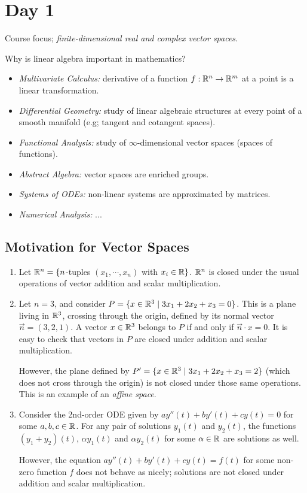 
\section{Day 1}

Course focus; \emph{finite-dimensional real and complex vector spaces}.

Why is linear algebra important in mathematics?
\begin{itemize}
\item \emph{Multivariate Calculus:} derivative of a function $f:\mathbb{R}^n\to\mathbb{R}^m$ at a point is a linear transformation.
\item \emph{Differential Geometry:} study of linear algebraic structures at every point of a smooth manifold (e.g; tangent and cotangent spaces).
\item \emph{Functional Analysis:} study of $\infty$-dimensional vector spaces (spaces of functions).
\item \emph{Abstract Algebra:} vector spaces are enriched groups.
\item \emph{Systems of ODEs:} non-linear systems are approximated by matrices.
\item \emph{Numerical Analysis:} ...
\end{itemize}

\separator

\subsection{Motivation for Vector Spaces}
\begin{enumerate}[Ex. A)]
\item Let $\mathbb{R}^n=\{n$-tuples $(x_1, \cdots, x_n)$ with $x_i\in\mathbb{R}\}$. $\mathbb{R}^n$ is closed under the usual operations of vector addition and scalar multiplication.

\item Let $n=3$, and consider $P=\{x\in\mathbb{R}^3 \mid 3x_1+2x_2+x_3=0\}$. This is a plane living in $\mathbb{R}^3$, crossing through the origin, defined by its normal vector $\vec{n}=(3,2,1)$. A vector $x\in\mathbb{R}^3$ belongs to $P$ if and only if $\vec{n}\cdot x = 0$. It is easy to check that vectors in $P$ are closed under addition and scalar multiplication.

	However, the plane defined by $P'=\{x\in\mathbb{R}^3 \mid 3x_1+2x_2+x_3=2\}$ (which does not cross through the origin) is not closed under those same operations. This is an example of an \emph{affine space}.

\item Consider the 2nd-order ODE given by $ay''(t)+by'(t)+cy(t)=0$ for some $a,b,c\in\mathbb{R}$. For any pair of solutions $y_1(t)$ and $y_2(t)$, the functions $(y_1+y_2)(t)$, $\alpha y_1(t)$ and $\alpha y_2(t)$ for some $\alpha\in\mathbb{R}$ are solutions as well.

	However, the equation $ay''(t)+by'(t)+cy(t)=f(t)$ for some non-zero function $f$ does not behave as nicely; solutions are not closed under addition and scalar multiplication.
\end{enumerate}

